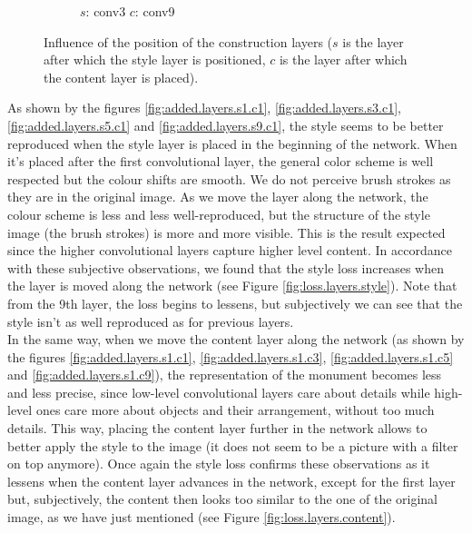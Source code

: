 \documentclass[twocolumn,superscriptaddress,aps,floatfix,nofootinbib]{revtex4-1}
\begin{document}
\begin{figure}[ht]
\begin{subfigure}[b]{0.1\textwidth}
            \caption{$s$: conv3 $c$: conv9}
            \label{fig:added.layers.s3.c9}
        \end{subfigure}
        \caption{Influence of the position of the construction layers ($s$ is the layer after which the style layer is positioned, $c$ is the layer after which the content layer is placed).}
        \label{fig:added.layers}
    \end{figure}
    
    As shown by the figures \ref{fig:added.layers.s1.c1}, \ref{fig:added.layers.s3.c1}, \ref{fig:added.layers.s5.c1} and \ref{fig:added.layers.s9.c1}, the style seems to be better reproduced when the style layer is placed in the beginning of the network. When it's placed after the first convolutional layer, the general color scheme is well respected but the colour shifts are smooth. We do not perceive brush strokes as they are in the original image. As we move the layer along the network, the colour scheme is less and less well-reproduced, but the structure of the style image (the brush strokes) is more and more visible. This is the result expected since the higher convolutional layers capture higher level content. In accordance with these subjective observations, we found that the style loss increases when the layer is moved along the network (see Figure \ref{fig:loss.layers.style}). Note that from the 9th layer, the loss begins to lessens, but subjectively we can see that the style isn't as well reproduced as for previous layers.\\
    
    In the same way, when we move the content layer along the network (as shown by the figures \ref{fig:added.layers.s1.c1}, \ref{fig:added.layers.s1.c3}, \ref{fig:added.layers.s1.c5} and \ref{fig:added.layers.s1.c9}), the representation of the monument becomes less and less precise, since low-level convolutional layers care about details while high-level ones care more about objects and their arrangement, without too much details. This way, placing the content layer  further in the network allows to better apply the style to the image (it does not seem to be a picture with a filter on top anymore). Once again the style loss confirms these observations as it lessens when the content layer advances in the network, except for the first layer but, subjectively, the content then looks too similar to the one of the original image, as we have just mentioned (see Figure \ref{fig:loss.layers.content}).\\
\end{document}
